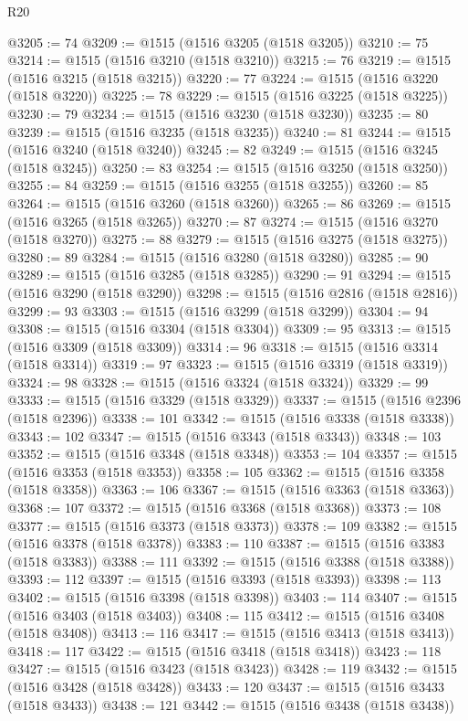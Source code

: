 \begin{lexlean}{R20}
\begin{coremodule}
{@3205 := 74
@3209 := @1515 (@1516 @3205 (@1518 @3205))
@3210 := 75
@3214 := @1515 (@1516 @3210 (@1518 @3210))
@3215 := 76
@3219 := @1515 (@1516 @3215 (@1518 @3215))
@3220 := 77
@3224 := @1515 (@1516 @3220 (@1518 @3220))
@3225 := 78
@3229 := @1515 (@1516 @3225 (@1518 @3225))
@3230 := 79
@3234 := @1515 (@1516 @3230 (@1518 @3230))
@3235 := 80
@3239 := @1515 (@1516 @3235 (@1518 @3235))
@3240 := 81
@3244 := @1515 (@1516 @3240 (@1518 @3240))
@3245 := 82
@3249 := @1515 (@1516 @3245 (@1518 @3245))
@3250 := 83
@3254 := @1515 (@1516 @3250 (@1518 @3250))
@3255 := 84
@3259 := @1515 (@1516 @3255 (@1518 @3255))
@3260 := 85
@3264 := @1515 (@1516 @3260 (@1518 @3260))
@3265 := 86
@3269 := @1515 (@1516 @3265 (@1518 @3265))
@3270 := 87
@3274 := @1515 (@1516 @3270 (@1518 @3270))
@3275 := 88
@3279 := @1515 (@1516 @3275 (@1518 @3275))
@3280 := 89
@3284 := @1515 (@1516 @3280 (@1518 @3280))
@3285 := 90
@3289 := @1515 (@1516 @3285 (@1518 @3285))
@3290 := 91
@3294 := @1515 (@1516 @3290 (@1518 @3290))
@3298 := @1515 (@1516 @2816 (@1518 @2816))
@3299 := 93
@3303 := @1515 (@1516 @3299 (@1518 @3299))
@3304 := 94
@3308 := @1515 (@1516 @3304 (@1518 @3304))
@3309 := 95
@3313 := @1515 (@1516 @3309 (@1518 @3309))
@3314 := 96
@3318 := @1515 (@1516 @3314 (@1518 @3314))
@3319 := 97
@3323 := @1515 (@1516 @3319 (@1518 @3319))
@3324 := 98
@3328 := @1515 (@1516 @3324 (@1518 @3324))
@3329 := 99
@3333 := @1515 (@1516 @3329 (@1518 @3329))
@3337 := @1515 (@1516 @2396 (@1518 @2396))
@3338 := 101
@3342 := @1515 (@1516 @3338 (@1518 @3338))
@3343 := 102
@3347 := @1515 (@1516 @3343 (@1518 @3343))
@3348 := 103
@3352 := @1515 (@1516 @3348 (@1518 @3348))
@3353 := 104
@3357 := @1515 (@1516 @3353 (@1518 @3353))
@3358 := 105
@3362 := @1515 (@1516 @3358 (@1518 @3358))
@3363 := 106
@3367 := @1515 (@1516 @3363 (@1518 @3363))
@3368 := 107
@3372 := @1515 (@1516 @3368 (@1518 @3368))
@3373 := 108
@3377 := @1515 (@1516 @3373 (@1518 @3373))
@3378 := 109
@3382 := @1515 (@1516 @3378 (@1518 @3378))
@3383 := 110
@3387 := @1515 (@1516 @3383 (@1518 @3383))
@3388 := 111
@3392 := @1515 (@1516 @3388 (@1518 @3388))
@3393 := 112
@3397 := @1515 (@1516 @3393 (@1518 @3393))
@3398 := 113
@3402 := @1515 (@1516 @3398 (@1518 @3398))
@3403 := 114
@3407 := @1515 (@1516 @3403 (@1518 @3403))
@3408 := 115
@3412 := @1515 (@1516 @3408 (@1518 @3408))
@3413 := 116
@3417 := @1515 (@1516 @3413 (@1518 @3413))
@3418 := 117
@3422 := @1515 (@1516 @3418 (@1518 @3418))
@3423 := 118
@3427 := @1515 (@1516 @3423 (@1518 @3423))
@3428 := 119
@3432 := @1515 (@1516 @3428 (@1518 @3428))
@3433 := 120
@3437 := @1515 (@1516 @3433 (@1518 @3433))
@3438 := 121
@3442 := @1515 (@1516 @3438 (@1518 @3438))
}
\end{coremodule}
\end{lexlean}
